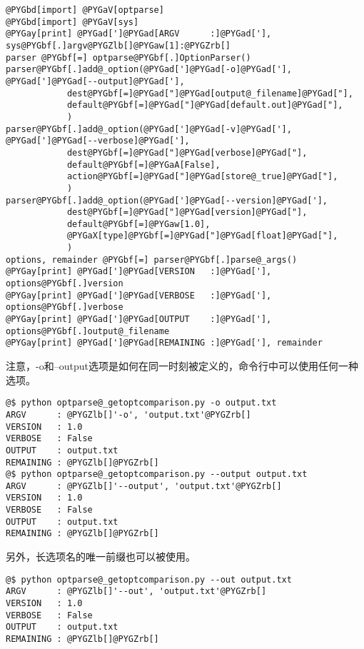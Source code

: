 \documentclass[letterpaper,10pt,english]{manual}
\begin{document}
\begin{Verbatim}[commandchars=@\[\]]
@PYGbd[import] @PYGaV[optparse]
@PYGbd[import] @PYGaV[sys]
@PYGay[print] @PYGad[']@PYGad[ARGV      :]@PYGad['], sys@PYGbf[.]argv@PYGZlb[]@PYGaw[1]:@PYGZrb[]
parser @PYGbf[=] optparse@PYGbf[.]OptionParser()
parser@PYGbf[.]add@_option(@PYGad[']@PYGad[-o]@PYGad['], @PYGad[']@PYGad[--output]@PYGad['],
            dest@PYGbf[=]@PYGad["]@PYGad[output@_filename]@PYGad["],
            default@PYGbf[=]@PYGad["]@PYGad[default.out]@PYGad["],
            )
parser@PYGbf[.]add@_option(@PYGad[']@PYGad[-v]@PYGad['], @PYGad[']@PYGad[--verbose]@PYGad['],
            dest@PYGbf[=]@PYGad["]@PYGad[verbose]@PYGad["],
            default@PYGbf[=]@PYGaA[False],
            action@PYGbf[=]@PYGad["]@PYGad[store@_true]@PYGad["],
            )
parser@PYGbf[.]add@_option(@PYGad[']@PYGad[--version]@PYGad['],
            dest@PYGbf[=]@PYGad["]@PYGad[version]@PYGad["],
            default@PYGbf[=]@PYGaw[1.0],
            @PYGaX[type]@PYGbf[=]@PYGad["]@PYGad[float]@PYGad["],
            )
options, remainder @PYGbf[=] parser@PYGbf[.]parse@_args()
@PYGay[print] @PYGad[']@PYGad[VERSION   :]@PYGad['], options@PYGbf[.]version
@PYGay[print] @PYGad[']@PYGad[VERBOSE   :]@PYGad['], options@PYGbf[.]verbose
@PYGay[print] @PYGad[']@PYGad[OUTPUT    :]@PYGad['], options@PYGbf[.]output@_filename
@PYGay[print] @PYGad[']@PYGad[REMAINING :]@PYGad['], remainder
\end{Verbatim}

注意，-o和--output选项是如何在同一时刻被定义的，命令行中可以使用任何一种选项。

\begin{Verbatim}[commandchars=@\[\]]
@$ python optparse@_getoptcomparison.py -o output.txt
ARGV      : @PYGZlb[]'-o', 'output.txt'@PYGZrb[]
VERSION   : 1.0
VERBOSE   : False
OUTPUT    : output.txt
REMAINING : @PYGZlb[]@PYGZrb[]
@$ python optparse@_getoptcomparison.py --output output.txt
ARGV      : @PYGZlb[]'--output', 'output.txt'@PYGZrb[]
VERSION   : 1.0
VERBOSE   : False
OUTPUT    : output.txt
REMAINING : @PYGZlb[]@PYGZrb[]
\end{Verbatim}

另外，长选项名的唯一前缀也可以被使用。

\begin{Verbatim}[commandchars=@\[\]]
@$ python optparse@_getoptcomparison.py --out output.txt
ARGV      : @PYGZlb[]'--out', 'output.txt'@PYGZrb[]
VERSION   : 1.0
VERBOSE   : False
OUTPUT    : output.txt
REMAINING : @PYGZlb[]@PYGZrb[]
\end{Verbatim}
\end{document}
